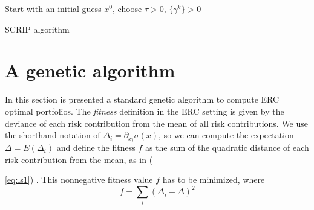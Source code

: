 \begin{algorithm}
Start with an initial guess $x^{0}$, choose $\tau > 0$, $\{\gamma^k\}>0$\\
\caption{SCRIP algorithm}
\label{alg:scrip}
\end{algorithm}


\section{A genetic algorithm}
In this section is presented a standard genetic algorithm to compute ERC optimal portfolios. The \textit{fitness} definition in the ERC setting is given by the deviance of each risk contribution from the mean of all risk contributions\footnotemark[3]. We use the shorthand notation of $\Delta_i = \partial_{x_i} \sigma (x)$, so we can compute the expectation $\Delta = E(\Delta_i)$ and define the fitness $f$ as the sum of the quadratic distance of each risk contribution from the mean, as in ({\ref{eq:ls1}) \cite{genetic}. This nonnegative fitness value $f$ has to be minimized, where
\begin{equation}
f= \sum_i (\Delta_i - \Delta)^2
\end{equation}

}
